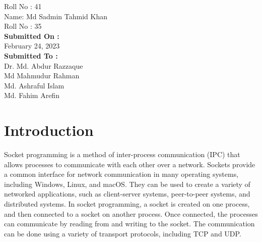 \documentclass[11pt]{article}
\begin{document}
\begin{titlepage}
\begin{large}
			Roll No : 41\\[12pt]
			Name: Md Sadmin Tahmid Khan\\[8pt]
			Roll No : 35\\[12pt]
		\textbf{Submitted On : \\[12pt]}
			February 24, 2023\\[20pt]
		\textbf{Submitted To :\\[12pt]}
			Dr. Md. Abdur Razzaque\\[12pt]
                Md Mahmudur Rahman\\[12pt]
                Md. Ashraful Islam\\[12pt]
                Md. Fahim Arefin
	\end{large}
\end{titlepage}

\section{Introduction}
Socket programming is a method of inter-process communication (IPC) that allows processes to communicate with each other over a network. Sockets provide a common interface for network communication in many operating systems, including Windows, Linux, and macOS. They can be used to create a variety of networked applications, such as client-server systems, peer-to-peer systems, and distributed systems. In socket programming, a socket is created on one process, and then connected to a socket on another process. Once connected, the processes can communicate by reading from and writing to the socket. The communication can be done using a variety of transport protocols, including TCP and UDP.
\end{document}

